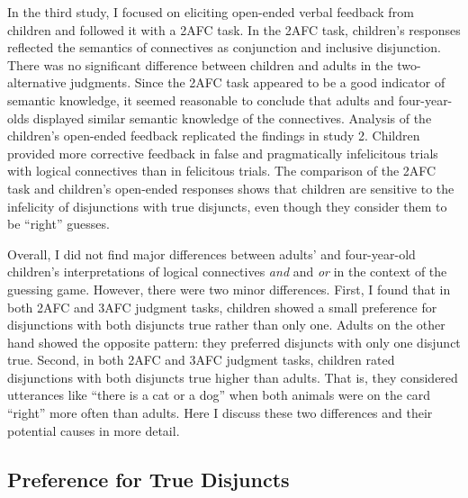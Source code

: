 \documentclass[oneside]{report}
\theoremstyle{definition}
\theoremstyle{definition}
\theoremstyle{definition}
\theoremstyle{remark}
\begin{document}
In the third study, I focused on eliciting open-ended verbal feedback
from children and followed it with a 2AFC task. In the 2AFC task,
children's responses reflected the semantics of connectives as
conjunction and inclusive disjunction. There was no significant
difference between children and adults in the two-alternative judgments.
Since the 2AFC task appeared to be a good indicator of semantic
knowledge, it seemed reasonable to conclude that adults and
four-year-olds displayed similar semantic knowledge of the connectives.
Analysis of the children's open-ended feedback replicated the findings
in study 2. Children provided more corrective feedback in false and
pragmatically infelicitous trials with logical connectives than in
felicitous trials. The comparison of the 2AFC task and children's
open-ended responses shows that children are sensitive to the infelicity
of disjunctions with true disjuncts, even though they consider them to
be ``right'' guesses.

Overall, I did not find major differences between adults' and
four-year-old children's interpretations of logical connectives
\emph{and} and \emph{or} in the context of the guessing game. However,
there were two minor differences. First, I found that in both 2AFC and
3AFC judgment tasks, children showed a small preference for disjunctions
with both disjuncts true rather than only one. Adults on the other hand
showed the opposite pattern: they preferred disjuncts with only one
disjunct true. Second, in both 2AFC and 3AFC judgment tasks, children
rated disjunctions with both disjuncts true higher than adults. That is,
they considered utterances like ``there is a cat or a dog'' when both
animals were on the card ``right'' more often than adults. Here I
discuss these two differences and their potential causes in more detail.

\subsection{Preference for True Disjuncts}\label{conjunctive}
\end{document}
